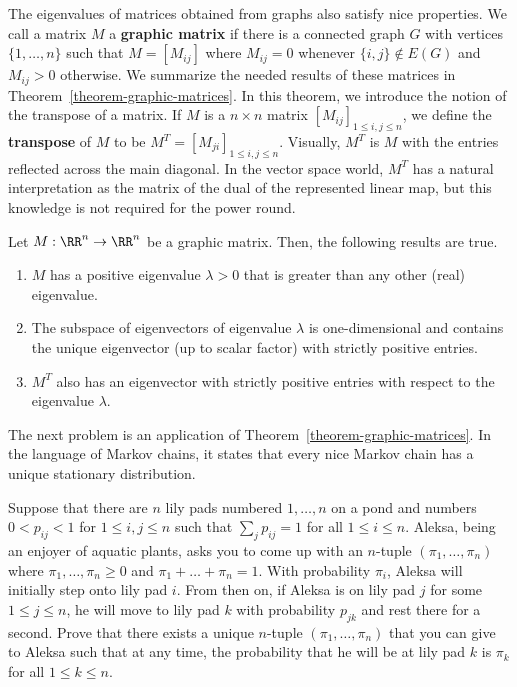 \documentclass[11pt]{article}
\begin{document}
The eigenvalues of matrices obtained from graphs also satisfy nice properties. We call a matrix $M$ a \textbf{graphic matrix} if there is a connected graph $G$ with vertices $\{1, \ldots, n\}$ such that $M = [M_{ij}]$ where $M_{ij} = 0$ whenever $\{i, j\} \notin E(G)$ and $M_{ij} > 0$ otherwise. We summarize the needed results of these matrices in Theorem~\ref{theorem-graphic-matrices}. In this theorem, we introduce the notion of the transpose of a matrix. If $M$ is a $n \times n$ matrix $[M_{ij}]_{1 \leq i, j \leq n}$, we define the \textbf{transpose} of $M$ to be $M^T = [M_{ji}]_{1 \leq i, j \leq n}$. Visually, $M^T$ is $M$ with the entries reflected across the main diagonal. In the vector space world, $M^T$ has a natural interpretation as the matrix of the dual of the represented linear map, but this knowledge is not required for the power round. 

\begin{thm} \label{theorem-graphic-matrices}
    Let $M : \RR^n \to \RR^n$ be a graphic matrix. Then, the following results are true. 
    \begin{enumerate}[label = (\alph*)]
        \item $M$ has a positive eigenvalue $\lambda > 0$ that is greater than any other (real) eigenvalue. 
        \item The subspace of eigenvectors of eigenvalue $\lambda$ is one-dimensional and contains the unique eigenvector (up to scalar factor) with strictly positive entries. 
        \item $M^T$ also has an eigenvector with strictly positive entries with respect to the eigenvalue $\lambda$. 
    \end{enumerate}
\end{thm}

The next problem is an application of Theorem~\ref{theorem-graphic-matrices}. In the language of Markov chains, it states that every nice Markov chain has a unique stationary distribution. 

\begin{prob} [15 points]
    Suppose that there are $n$ lily pads numbered $1, \ldots, n$ on a pond and numbers $0 < p_{ij} < 1$ for $1 \leq i, j \leq n$ such that $\sum_j p_{ij} = 1$ for all $1 \leq i \leq n$. Aleksa, being an enjoyer of aquatic plants, asks you to come up with an $n$-tuple $(\pi_1, \ldots, \pi_n)$ where $\pi_1, \ldots, \pi_n \geq 0$ and $\pi_1 + \ldots + \pi_n = 1$. With probability $\pi_i$, Aleksa will initially step onto lily pad $i$. From then on, if Aleksa is on lily pad $j$ for some $1 \leq j \leq n$, he will move to lily pad $k$ with probability $p_{jk}$ and rest there for a second. Prove that there exists a unique $n$-tuple $(\pi_1, \ldots, \pi_n)$ that you can give to Aleksa such that at any time, the probability that he will be at lily pad $k$ is $\pi_k$ for all $1 \leq k \leq n$.
\end{prob}
\end{document}
